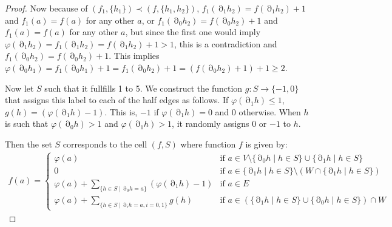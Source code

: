 \documentclass{article}
\DeclareMathOperator{\bnd}{\partial}
\begin{document}
\begin{proof}
Now because of  $(f_1, \{h_1\})\prec (f, \{h_1, h_2\})$, $f_1(\bnd_1h_2)= f(\bnd_1h_2)+1$ and $f_1(a)=f(a)$ for any other $a$, or $f_1(\bnd_0h_2)= f(\bnd_0h_2)+1$ and $f_1(a)=f(a)$ for any other $a$, but since the first one would imply $\varphi(\bnd_1h_2)=f_1(\bnd_1h_2)= f(\bnd_1 h_2)+1>1$, this is a contradiction and $f_1(\bnd_0h_2)= f(\bnd_0h_2)+1$. This implies $\varphi(\bnd_0 h_1)=  f_1(\bnd_0h_1)+1=  f_1(\bnd_0h_2)+1= (f(\bnd_0h_2)+1)+1\geq 2$.


Now let $S$ such that it fullfills 1 to 5. We construct the function $g:S\to \{-1,0\}$ that assigns this label to each of the half edges as follows. If $\varphi(\bnd_1h)\leq 1$,
$g(h)=(\varphi(\bnd_1 h)-1)$. This is, $-1$ if  $\varphi(\bnd_1 h)=0$ and $0$ otherwise. When $h$ is such that $\varphi(\bnd_0h)>1$ and $\varphi(\bnd_1h)> 1 $, it randomly assigns $0$ or $-1$ to $h$.

Then the set $S$ corresponds to the cell $(f, S)$ where function $f$ is given by:
\begin{align*}
    f(a) = \begin{cases}
        \varphi(a) & \text{if } a\in V\setminus \{\bnd_0h \mid h\in S\}\cup \{\bnd_1 h \mid h\in S\}\\ 
0 &  \text{if } a\in  \{\bnd_1 h \mid h\in S\} \setminus \left( W \cap \{\bnd_1 h \mid h\in S\} \right) \\ 
\varphi(a)+\sum\limits_{\{h\in S \mid \bnd_0h = a\}} (\varphi(\bnd_1h)-1) & \text{if } a\in E\\
\varphi(a)+ \sum\limits_{\{h\in S \mid \bnd_ih = a, i=0,1\}} g(h) &  \text{if } a\in \left( \{\bnd_1 h \mid h\in S\} \cup \{\bnd_0 h \mid h\in S\}\right) \cap W 
    \end{cases}
\end{align*}
\end{proof}
\end{document}
